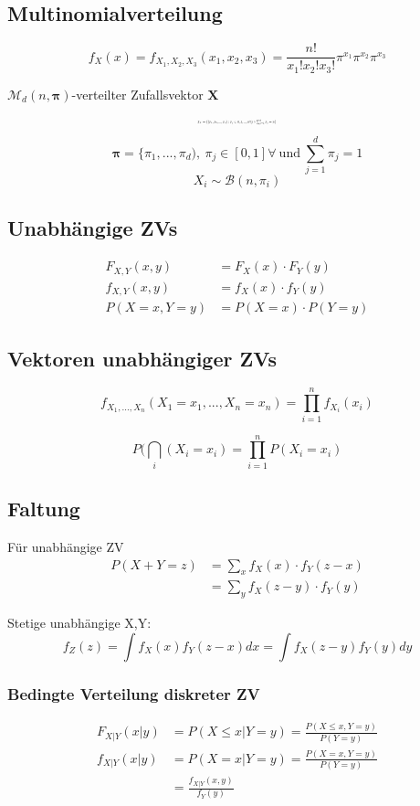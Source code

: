 \documentclass[10pt,a4paper,landscape]{article}
\begin{document}
\begin{multicols}{4}
\subsection{Multinomialverteilung}
\[
f_X(x)=f_{X_1, X_2, X_3}(x_1,x_2,x_3)=\frac{n!}{x_1!x_2!x_3!}\pi^{x_1}\pi^{x_2}\pi^{x_3}
\]

$\mathcal{M}_{d}(n, \boldsymbol{\pi})$-verteilter Zufallsvektor $\boldsymbol{X}$
\[ \resizebox{0.18\textwidth}{!}{$
T_X=\{(x_1, x_2, ..., x_d): x_j \in {0,1, ...,n} \forall j \wedge \sum_{j=1}^dx_j=n\}
$}
\]
\[
\boldsymbol{\pi} = \{ \pi_1, ..., \pi_d), ~ \pi_j \in [0,1] \forall ~\text{und}~ \sum_{j=1}^d \pi_j=1
\]
\[
X_i \sim \mathcal{B}(n, \pi_i)
\]

\subsection{Unabhängige ZVs}
\begin{align*}
F_{X,Y}(x,y) &= F_X(x) \cdot F_Y(y) \\
f_{X,Y}(x,y)&=f_X(x) \cdot f_Y(y) \\
P(X=x,Y=y) &= P(X=x) \cdot P(Y=y)
\end{align*}

\subsection{Vektoren unabhängiger ZVs}
\[
f_{X_1, ..., X_n}(X_1 = x_1, ..., X_n= x_n)= \prod_{i=1}^nf_{X_i}(x_i)
\]

\[
P(\bigcap_i (X_i = x_i)= \prod_{i=1}^n P(X_i = x_i)
\]

\subsection{Faltung}
Für unabhängige ZV
\begin{align*}
P(X+Y = z) &= \sum_x f_X(x) \cdot f_Y(z-x)\\
		&= \sum_y f_X(z-y) \cdot f_Y(y)
\end{align*}

Stetige unabhängige X,Y:
\[
f_Z(z)=\int f_X(x)f_Y(z-x)dx = \int f_X(z-y)f_Y(y)dy
\]

\subsubsection*{Bedingte Verteilung diskreter ZV}
\begin{align*}
F_{X|Y}(x|y) &= P(X \leq x | Y=y) = \frac{P(X \leq x, Y =y)}{P(Y=y)} \\
f_{X|Y}(x|y) &= P(X =x | Y=y) = \frac{P(X=x, Y=y)}{P(Y=y)} \\
&= \frac{f_{X|Y}(x,y)}{f_Y(y)}
\end{align*}


\end{multicols}
\end{document}
